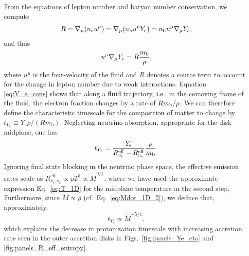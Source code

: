 From the equations of lepton number and baryon number conservation, we
compute
\begin{equation}
  R = \nabla_\mu(n_e u^\mu) = \nabla_\mu(n_{\rm b} u^\mu Y_e) = n_{\rm b} u^\mu
  \nabla_\mu Y_e,
\end{equation}
and thus
\begin{equation}
  u^\mu \nabla_\mu Y_e = R \frac{m_{\rm b}}{\rho}, \label{eq:Y_e_cons}
\end{equation}
where $u^\mu$ is the four-velocity of the fluid and $R$ denotes a source term to account for the change in lepton number due to weak interactions. Equation \eqref{eq:Y_e_cons} shows that along a fluid trajectory, i.e., in the comoving frame of the fluid, the electron fraction changes by a rate of $R m_{\rm b}/ \rho$. We can therefore define the characteristic timescale for the composition of matter to change by $t_{Y_e} \equiv Y_e\rho / (R m_\mathrm{b})$. Neglecting neutrino absorption, appropriate for the disk midplane, one has
\begin{equation}
  t_{Y_e} = \frac{Y_e}{R_{\bar{\nu_e}}^\mathrm{eff} -
    R_{\nu_e}^\mathrm{eff}}\frac{\rho}{m_{\rm b}}. \label{eq:t_Ye}
\end{equation}
Ignoring final state blocking in the neutrino phase space, the effective emission rates scale as \cite{tubbs_neutrino_1975,Bruenn:1985en} $R_{\bar{\nu}_e,\nu_e}^\mathrm{eff} \propto \rho T^5 \propto \dot{M}^{9/4}$, where we have used the approximate expression Eq.~\eqref{eq:T_1D} for the midplane temperature in the second step. Furthermore, since $\dot{M}\propto \rho$ (cf.~Eq.~\eqref{eq:Mdot_1D_2}), we deduce that, approximately,
\begin{equation}
  t_{Y_e} \propto \dot{M}^{-5/4},  \label{eq:t_Ye_scale_Mdot}
\end{equation}
which explains the decrease in protonization timescale with increasing accretion rate seen in the outer accretion disks in Figs.~\ref{fig:panels_Ye_eta} and \ref{fig:panels_R_eff_entropy}.

